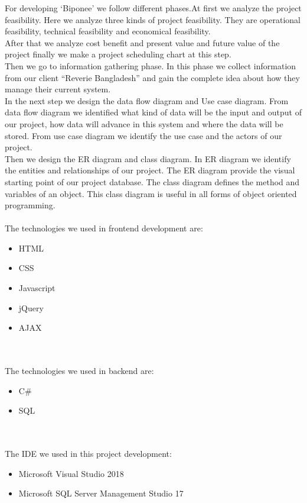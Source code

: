 For developing ‘Biponee’ we follow different phases.At first we analyze the project feasibility. Here we analyze three kinds of project feasibility. They are operational feasibility, technical feasibility and economical feasibility. \\
After that we analyze cost benefit and present value and future value of the project finally we make a project scheduling chart at this step.\\
Then we go to information gathering phase. In this phase we collect information from our client “Reverie Bangladesh” and gain the complete idea about how they manage their current system. \\
In the next step we design the data flow diagram and Use case diagram. From data flow diagram we identified what kind of data will be the input and output of our project, how data will advance in this system and where the data will be stored. From use case diagram we identify the use case and the actors of our project.\\
Then we design the ER diagram and class diagram. In ER diagram we identify the entities and relationships of our project. The ER diagram provide the visual starting point of our project database. The class diagram defines the method and variables of an object. This class diagram is useful in all forms of object oriented programming.\\\\
The technologies we used in frontend development are:
\begin{itemize}
    \item HTML
    \item CSS
    \item Javascript
    \item jQuery
    \item AJAX
\end{itemize}
\\\\
The technologies we used in backend are:
\begin{itemize}
    \item C#
    \item SQL
    
\end{itemize}
\\\\

The IDE we used in this project development:
\begin{itemize}
    \item Microsoft Visual Studio 2018
    \item Microsoft SQL Server Management Studio 17
    
\end{itemize}
\\\\

